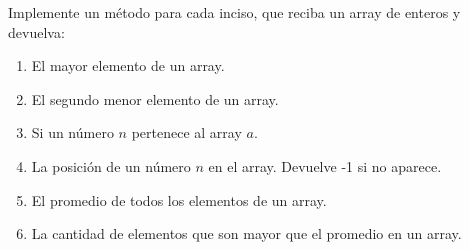 Implemente un método para cada inciso, que reciba un array de enteros y devuelva:
\begin{enumerate}[label=\alph*)]
    \item El mayor elemento de un array.
    \item El segundo menor elemento de un array.
    \item Si un número \(n\) pertenece al array \(a\).
    \item La posición de un número \(n\) en el array. Devuelve -1 si no aparece.
    \item El promedio de todos los elementos de un array.
    \item La cantidad de elementos que son mayor que el promedio en un array.
\end{enumerate}